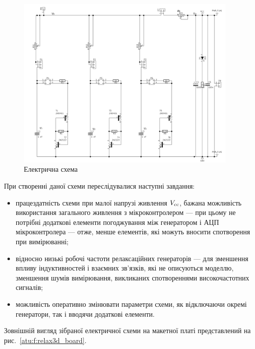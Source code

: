 \begin{figure}[htb!]
  \centerline{\includegraphics[width=0.96\textwidth]{p/relax3d_schem.png} }
\caption{Електрична схема \RelaxBjtIi}
\label{atu:f:relax3d_schem}
\end{figure}

При створенні даної схеми переслідувалися наступні завдання:
\begin{itemize}


  \item
    працездатність схеми при малої напрузі живлення
    $ V _\mathrm{cc} $, бажана можливість використання загального живлення
    з мікроконтролером --- при цьому не потрібні додаткові
    елементи погоджування між генератором і АЦП мікроконтролера
    --- отже, менше елементів, які можуть вносити спотворення при
    вимірюванні;

  \item
    відносно низькі робочі частоти релаксаційних генераторів ---
    для зменшення впливу індуктивностей і взаємних зв'язків, які
    не описуються моделлю, зменшення шумів вимірювання, викликаних
    спотвореннями високочастотних сигналів;

  \item
    можливість оперативно змінювати параметри схеми, як відключаючи
    окремі генератори, так і вводячи додаткові елементи.

\end{itemize}

Зовнішній вигляд зібраної електричної схеми на макетної платі
представлений на рис.~\ref{atu:f:relax3d_board}.

